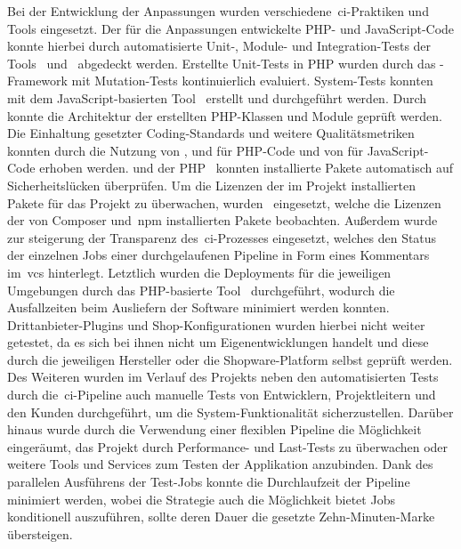 Bei der Entwicklung der Anpassungen wurden verschiedene\ \acrshort{ci}-Praktiken und Tools eingesetzt.
Der für die Anpassungen entwickelte PHP- und JavaScript-Code konnte hierbei durch automatisierte Unit-, Module- und
Integration-Tests der Tools\  und\  abgedeckt werden.
Erstellte Unit-Tests in PHP wurden durch das -Framework mit Mutation-Tests kontinuierlich
evaluiert.
System-Tests konnten mit dem JavaScript-basierten Tool\  erstellt und durchgeführt werden.
Durch\  konnte die Architektur der erstellten PHP-Klassen und Module geprüft werden.
Die Einhaltung gesetzter Coding-Standards und weitere Qualitätsmetriken konnten durch die Nutzung von
,  und  für PHP-Code und von  für
JavaScript-Code erhoben werden.
 und der PHP\  konnten installierte Pakete automatisch auf
Sicherheitslücken überprüfen.
Um die Lizenzen der im Projekt installierten Pakete für das Projekt zu überwachen, wurden\ 
eingesetzt, welche die Lizenzen der von Composer und\ \acrshort{npm} installierten Pakete beobachten.
Außerdem wurde\  zur steigerung der Transparenz des\ \acrshort{ci}-Prozesses eingesetzt, welches
den Status der einzelnen Jobs einer durchgelaufenen Pipeline in Form eines Kommentars im\ \acrshort{vcs} hinterlegt.
Letztlich wurden die Deployments für die jeweiligen Umgebungen durch das PHP-basierte Tool\ 
durchgeführt, wodurch die Ausfallzeiten beim Ausliefern der Software minimiert werden konnten.
\\
Drittanbieter-Plugins und Shop-Konfigurationen wurden hierbei nicht weiter getestet, da es sich bei ihnen nicht um
Eigenentwicklungen handelt und diese durch die jeweiligen Hersteller oder die Shopware-Platform selbst geprüft werden.
Des Weiteren wurden im Verlauf des Projekts neben den automatisierten Tests durch die\ \acrshort{ci}-Pipeline auch
manuelle Tests von Entwicklern, Projektleitern und den Kunden durchgeführt, um die System-Funktionalität
sicherzustellen.
Darüber hinaus wurde durch die Verwendung einer flexiblen Pipeline die Möglichkeit eingeräumt, das Projekt durch
Performance- und Last-Tests zu überwachen oder weitere Tools und Services zum Testen der Applikation anzubinden.
Dank des parallelen Ausführens der Test-Jobs konnte die Durchlaufzeit der Pipeline minimiert werden, wobei die
Strategie auch die Möglichkeit bietet Jobs konditionell auszuführen, sollte deren Dauer die gesetzte Zehn-Minuten-Marke
übersteigen.

\clearpage
